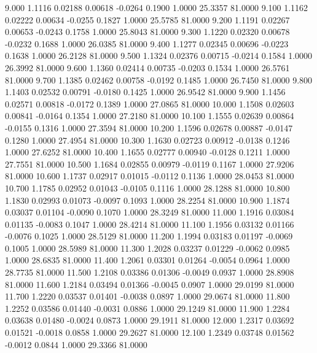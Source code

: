    9.000   1.1116   0.02188   0.00618  -0.0264   0.1900   1.0000  25.3357  81.0000
   9.100   1.1162   0.02222   0.00634  -0.0255   0.1827   1.0000  25.5785  81.0000
   9.200   1.1191   0.02267   0.00653  -0.0243   0.1758   1.0000  25.8043  81.0000
   9.300   1.1220   0.02320   0.00678  -0.0232   0.1688   1.0000  26.0385  81.0000
   9.400   1.1277   0.02345   0.00696  -0.0223   0.1638   1.0000  26.2128  81.0000
   9.500   1.1324   0.02376   0.00715  -0.0214   0.1584   1.0000  26.3992  81.0000
   9.600   1.1360   0.02414   0.00735  -0.0203   0.1534   1.0000  26.5761  81.0000
   9.700   1.1385   0.02462   0.00758  -0.0192   0.1485   1.0000  26.7450  81.0000
   9.800   1.1403   0.02532   0.00791  -0.0180   0.1425   1.0000  26.9542  81.0000
   9.900   1.1456   0.02571   0.00818  -0.0172   0.1389   1.0000  27.0865  81.0000
  10.000   1.1508   0.02603   0.00841  -0.0164   0.1354   1.0000  27.2180  81.0000
  10.100   1.1555   0.02639   0.00864  -0.0155   0.1316   1.0000  27.3594  81.0000
  10.200   1.1596   0.02678   0.00887  -0.0147   0.1280   1.0000  27.4954  81.0000
  10.300   1.1630   0.02723   0.00912  -0.0138   0.1246   1.0000  27.6252  81.0000
  10.400   1.1655   0.02777   0.00940  -0.0128   0.1211   1.0000  27.7551  81.0000
  10.500   1.1684   0.02855   0.00979  -0.0119   0.1167   1.0000  27.9206  81.0000
  10.600   1.1737   0.02917   0.01015  -0.0112   0.1136   1.0000  28.0453  81.0000
  10.700   1.1785   0.02952   0.01043  -0.0105   0.1116   1.0000  28.1288  81.0000
  10.800   1.1830   0.02993   0.01073  -0.0097   0.1093   1.0000  28.2254  81.0000
  10.900   1.1874   0.03037   0.01104  -0.0090   0.1070   1.0000  28.3249  81.0000
  11.000   1.1916   0.03084   0.01135  -0.0083   0.1047   1.0000  28.4214  81.0000
  11.100   1.1956   0.03132   0.01166  -0.0076   0.1025   1.0000  28.5129  81.0000
  11.200   1.1994   0.03183   0.01197  -0.0069   0.1005   1.0000  28.5989  81.0000
  11.300   1.2028   0.03237   0.01229  -0.0062   0.0985   1.0000  28.6835  81.0000
  11.400   1.2061   0.03301   0.01264  -0.0054   0.0964   1.0000  28.7735  81.0000
  11.500   1.2108   0.03386   0.01306  -0.0049   0.0937   1.0000  28.8908  81.0000
  11.600   1.2184   0.03494   0.01366  -0.0045   0.0907   1.0000  29.0199  81.0000
  11.700   1.2220   0.03537   0.01401  -0.0038   0.0897   1.0000  29.0674  81.0000
  11.800   1.2252   0.03586   0.01440  -0.0031   0.0886   1.0000  29.1249  81.0000
  11.900   1.2284   0.03638   0.01480  -0.0024   0.0873   1.0000  29.1911  81.0000
  12.000   1.2317   0.03692   0.01521  -0.0018   0.0858   1.0000  29.2627  81.0000
  12.100   1.2349   0.03748   0.01562  -0.0012   0.0844   1.0000  29.3366  81.0000
